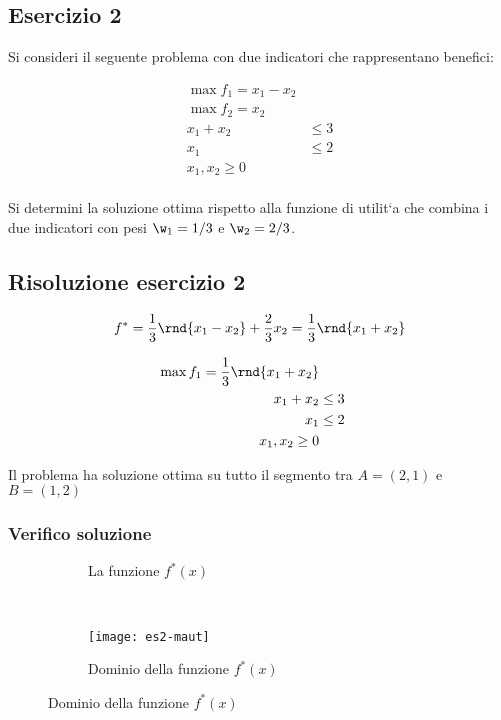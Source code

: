 \documentclass[\main/main.tex]{subfiles}
\begin{document}
\subsection{Esercizio 2}
Si consideri il seguente problema con due indicatori che rappresentano benefici:

\begin{align*}
  \max f_1 = x_1 -x_2 \\
  \max f_2 = x_2      \\
  x_1 + x_2 & \leq 3  \\
  x_1       & \leq 2  \\
  x_1, x_2 \geq 0     \\
\end{align*}

Si determini la soluzione ottima rispetto alla funzione di utilit`a che combina i
due indicatori con pesi $\w_1 = 1/3$ e $\w_2 = 2/3$.

\subsection{Risoluzione esercizio 2}

\[
  f^* = \frac{1}{3}\rnd{x_1-x_2} + \frac{2}{3}x_2 = \frac{1}{3}\rnd{x_1 + x_2}
\]


\begin{align*}
  \max f_1 = \frac{1}{3}\rnd{x_1 + x_2} \\
  x_1 + x_2 & \leq 3                    \\
  x_1       & \leq 2                    \\
  x_1, x_2 \geq 0                       \\
\end{align*}

Il problema ha soluzione ottima su tutto il segmento tra $A =(2,1)$ e $B = (1,2)$

\subsubsection*{Verifico soluzione}

\begin{figure}
  \begin{subfigure}{0.45\textwidth}
    \caption{La funzione $f^*(x)$}
  \end{subfigure}
  ~
  \begin{subfigure}{0.45\textwidth}
    \texttt{[image: es2-maut]}
    \caption{Dominio della funzione $f^*(x)$}
  \end{subfigure}
\end{figure}
\end{document}
